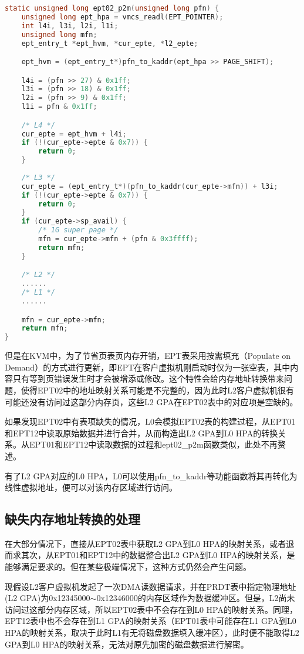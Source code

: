 \begin{lstlisting}[language={C}, caption={ept02\_p2m函数实现源码}]
static unsigned long ept02_p2m(unsigned long pfn) {
    unsigned long ept_hpa = vmcs_readl(EPT_POINTER);
    int l4i, l3i, l2i, l1i;
    unsigned long mfn;
    ept_entry_t *ept_hvm, *cur_epte, *l2_epte;

    ept_hvm = (ept_entry_t*)pfn_to_kaddr(ept_hpa >> PAGE_SHIFT);

    l4i = (pfn >> 27) & 0x1ff;
    l3i = (pfn >> 18) & 0x1ff;
    l2i = (pfn >> 9) & 0x1ff;
    l1i = pfn & 0x1ff;

    /* L4 */
    cur_epte = ept_hvm + l4i;
    if (!(cur_epte->epte & 0x7)) {
        return 0;
    }
    
    /* L3 */
    cur_epte = (ept_entry_t*)(pfn_to_kaddr(cur_epte->mfn)) + l3i;
    if (!(cur_epte->epte & 0x7)) {
        return 0;
    }
    if (cur_epte->sp_avail) {
    	/* 1G super page */
        mfn = cur_epte->mfn + (pfn & 0x3ffff);
        return mfn;
    }

    /* L2 */
    ......
    /* L1 */
    ......

    mfn = cur_epte->mfn;
    return mfn;
}
\end{lstlisting}

但是在KVM中，为了节省页表页内存开销，EPT表采用按需填充（Populate on Demand）的方式进行更新，即EPT在客户虚拟机刚启动时仅为一张空表，其中内容只有等到页错误发生时才会被增添或修改。这个特性会给内存地址转换带来问题，使得EPT02中的地址映射关系可能是不完整的，因为此时L2客户虚拟机很有可能还没有访问过这部分内存页，这些L2 GPA在EPT02表中的对应项是空缺的。

如果发现EPT02中有表项缺失的情况，L0会模拟EPT02表的构建过程，从EPT01和EPT12中读取原始数据并进行合并，从而构造出L2 GPA到L0 HPA的转换关系。从EPT01和EPT12中读取数据的过程和ept02\_p2m函数类似，此处不再赘述。

有了L2 GPA对应的L0 HPA，L0可以使用pfn\_to\_kaddr等功能函数将其再转化为线性虚拟地址，便可以对该内存区域进行访问。

\subsection{缺失内存地址转换的处理}

在大部分情况下，直接从EPT02表中获取L2 GPA到L0 HPA的映射关系，或者退而求其次，从EPT01和EPT12中的数据整合出L2 GPA到L0 HPA的映射关系，是能够满足要求的。但在某些极端情况下，这种方式仍然会产生问题。

现假设L2客户虚拟机发起了一次DMA读数据请求，并在PRDT表中指定物理地址(L2 GPA)为0x12345000$\sim$0x12346000的内存区域作为数据缓冲区。但是，L2尚未访问过这部分内存区域，所以EPT02表中不会存在到L0 HPA的映射关系。同理，EPT12表中也不会存在到L1 GPA的映射关系（EPT01表中可能存在L1 GPA到L0 HPA的映射关系，取决于此时L1有无将磁盘数据填入缓冲区），此时便不能取得L2 GPA到L0 HPA的映射关系，无法对原先加密的磁盘数据进行解密。

